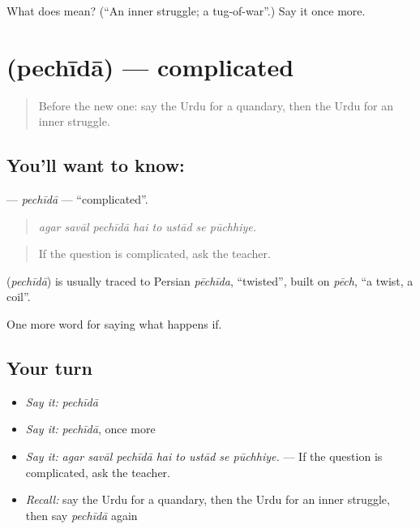 \begin{tcolorbox}[breakable,colback=teal!4,colframe=teal!35!black,title={Before you move on}]
What does  mean? (\textquotedblleft{}An inner struggle; a tug-of-war\textquotedblright{}.) Say it once more.
\end{tcolorbox}
\section[\texorpdfstring{\ur{پیچیدہ} (pechīdā)}{پیچیدہ (pechīdā)}]{ (pechīdā) — complicated}

\label{lesson:UR-C529-pechida}



\begin{quote}
Before the new one: say the Urdu for a quandary, then the Urdu for an inner struggle.
\end{quote}

\subsection*{You'll want to know: }
\textbf{} — \emph{pechīdā} — \textquotedblleft{}complicated\textquotedblright{}.

\begin{quote}
       
\end{quote}

\begin{quote}
\emph{agar savāl pechīdā hai to ustād se pūchhiye.}
\end{quote}

\begin{quote}
If the question is complicated, ask the teacher.
\end{quote}

\begin{cousinweb}
\textbf{} (\emph{pechīdā}) is usually traced to Persian \emph{pēchīda}, \textquotedblleft{}twisted\textquotedblright{}, built on \emph{pēch}, \textquotedblleft{}a twist, a coil\textquotedblright{}.
\end{cousinweb}

\begin{grammarlens}[title={What you've built}]
One more word for saying what happens if.
\end{grammarlens}

\subsection*{Your turn}
\begin{itemize}
\raggedright
  \item \emph{Say it:} \emph{pechīdā}
  \item \emph{Say it:} \emph{pechīdā}, once more
  \item \emph{Say it:} \emph{agar savāl pechīdā hai to ustād se pūchhiye.} — If the question is complicated, ask the teacher.
  \item \emph{Recall:} say the Urdu for a quandary, then the Urdu for an inner struggle, then say \emph{pechīdā} again
\end{itemize}

